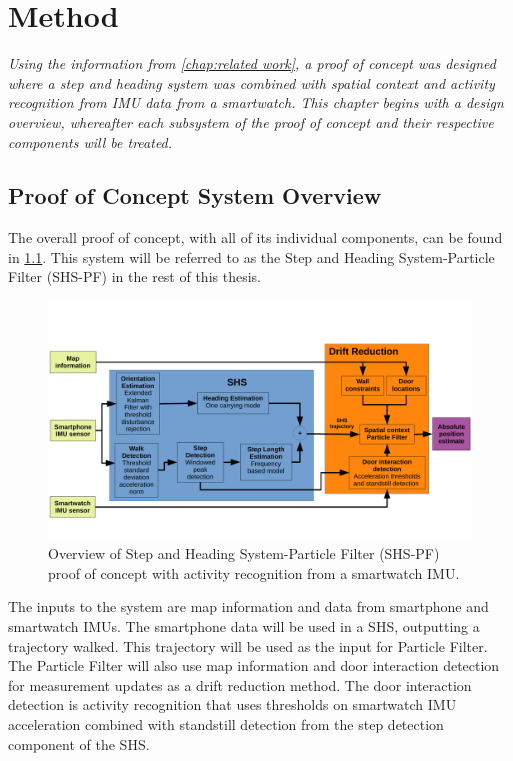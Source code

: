 \chapter{Method}
\label{chap:method}
\textit{Using the information from \cref{chap:related work}, a proof of concept was designed where a step and heading system was combined with spatial context and activity recognition from IMU data from a smartwatch. This chapter begins with a design overview, whereafter each subsystem of the proof of concept and their respective components will be treated.}

\section{Proof of Concept System Overview}
The overall proof of concept, with all of its individual components, can be found in \cref{fig:system_design}. This system will be referred to as the Step and Heading System-Particle Filter (SHS-PF) in the rest of this thesis.
\begin{figure}[H]
	\centering
	\includegraphics[trim=0 40 0 70, clip, width=1.1\linewidth]{images/system_design}
	\setlength{\abovecaptionskip}{3pt}
	\setlength{\belowcaptionskip}{-20pt}
	\caption{Overview of Step and Heading System-Particle Filter (SHS-PF) proof of concept  with activity recognition from a smartwatch IMU.}
	\label{fig:system_design}
\end{figure}
The inputs to the system are map information and data from smartphone and smartwatch IMUs. The smartphone data will be used in a \ac{SHS}, outputting a trajectory walked. This trajectory will be used as the input for Particle Filter. The Particle Filter will also use map information and door interaction detection for measurement updates as a drift reduction method. The door interaction detection is activity recognition that uses thresholds on smartwatch IMU acceleration combined with standstill detection from the step detection component of the \ac{SHS}. 

